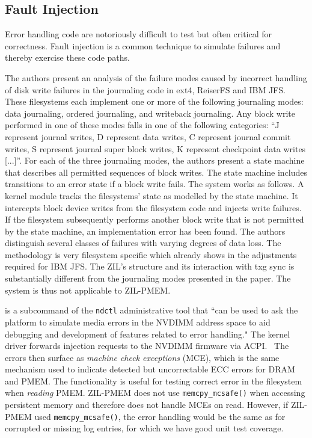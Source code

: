 \documentclass[12pt,a4paper,twoside]{book}
\begin{document}
\subsection{Fault Injection}\label{sec:rel_work:fault_injection}
Error handling code are notoriously difficult to test but often critical for correctness.
Fault injection is a common technique to simulate failures and thereby exercise these code paths.

The authors present an analysis of the failure modes caused by incorrect handling of disk write failures in the journaling code in ext4, ReiserFS and IBM JFS.
These filesystems each implement one or more of the following journaling modes: data journaling, ordered journaling, and writeback journaling.
Any block write performed in one of these modes falls in one of the following categories:
“J represent journal writes, D represent data writes, C represent journal commit writes, S represent journal super block writes, K represent checkpoint data writes [...]”.
For each of the three journaling modes, the authors present a state machine that describes all permitted sequences of block writes.
The state machine includes transitions to an error state if a block write fails.
The system works as follows.
A kernel module tracks the filesystems' state as modelled by the state machine.
It intercepts block device writes from the filesystem code and injects write failures.
If the filesystem subsequently performs another block write that is not permitted by the state machine, an implementation error has been found.
The authors distinguish several classes of failures with varying degrees of data loss.
The methodology is very filesystem specific which already shows in the adjustments required for IBM JFS.
The ZIL's structure and its interaction with txg sync is substantially different from the journaling modes presented in the paper.
The system is thus not applicable to ZIL-PMEM.

 is a subcommand of the \lstinline{ndctl} administrative tool that
``can be used to ask the platform to simulate media errors in the NVDIMM address space to aid debugging and development of features related to error handling."
The kernel driver forwards injection requests to the NVDIMM firmware via ACPI.~\cite{NdctlPATCHV2}
The errors then surface as \textit{machine check exceptions} (MCE), which is the same mechanism used to indicate detected but uncorrectable ECC errors for DRAM and PMEM.
The functionality is useful for testing correct error in the filesystem when \textit{reading} PMEM.
ZIL-PMEM does not use \lstinline{memcpy_mcsafe()} when accessing persistent memory and therefore does not handle MCEs on read.
However, if ZIL-PMEM used \lstinline{memcpy_mcsafe()}, the error handling would be the same as for corrupted or missing log entries, for which we have good unit test coverage.
\end{document}

